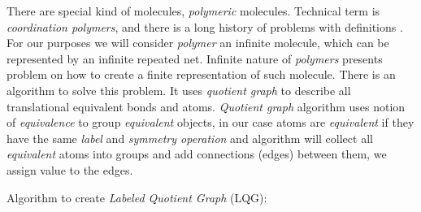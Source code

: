 
There are special kind of molecules, \textit{polymeric} molecules. Technical term is \textit{coordination polymers}, and there is a long history of problems with definitions \cite{Batten1998, Batten2012, Batten2013}. For our purposes we will consider \textit{polymer} an infinite molecule, which can be represented by an infinite repeated net. Infinite nature of \textit{polymers} presents problem on how to create a finite representation of such molecule.
There is an algorithm\cite{Chung1984} to solve this problem. It uses \textit{quotient graph} to describe all translational equivalent bonds and atoms. \textit{Quotient graph} algorithm uses notion of \textit{equivalence} to group \textit{equivalent} objects, in our case atoms are \textit{equivalent} if they have the same \textit{label} and \textit{symmetry operation} and algorithm will collect all \textit{equivalent} atoms into groups and add connections (edges) between them, we assign value to the edges.

Algorithm to create \textit{Labeled Quotient Graph} (LQG):

